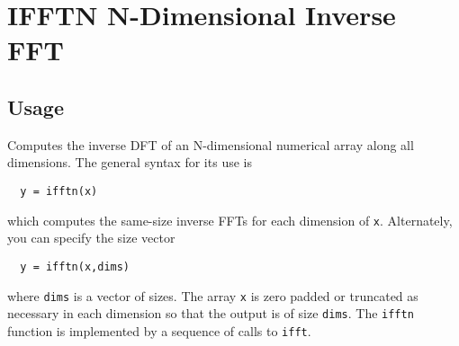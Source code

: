 \section{IFFTN N-Dimensional Inverse FFT }

\subsection{Usage}

Computes the inverse DFT of an N-dimensional numerical array along all
dimensions.  The general syntax for its use is
\begin{verbatim}
  y = ifftn(x)
\end{verbatim}
which computes the same-size inverse  FFTs for each dimension of \verb|x|.
Alternately, you can specify the size vector
\begin{verbatim}
  y = ifftn(x,dims)
\end{verbatim}
where \verb|dims| is a vector of sizes.  The array \verb|x| is zero padded
or truncated as necessary in each dimension so that the output
is of size \verb|dims|. The \verb|ifftn| function is implemented by a sequence
of calls to \verb|ifft|.
